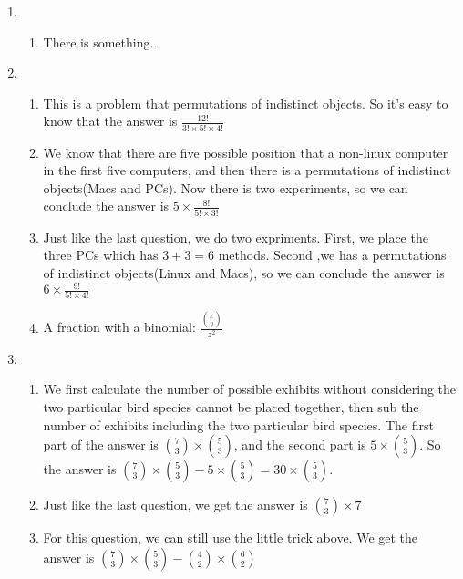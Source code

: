 \documentclass{article}
\begin{document}
\thispagestyle{fancy} %

\begin{enumerate}


	\item 
	
	\begin{enumerate}
		
		\item There is something..
		
	\end{enumerate}

	\item 
	
	\begin{enumerate}
		\item This is a problem that permutations of indistinct objects. So it's easy to know that the answer is $\frac{12!}{3!\times5!\times4!}$
		\item We know that there are five possible position that a non-linux computer in the first five computers, and then there is a permutations of indistinct objects(Macs and PCs). Now there is two experiments, so we can conclude the answer is $5\times\frac{8!}{5!\times3!}$
		\item Just like the last question, we do two expriments. First, we place the three PCs which has $3+3=6$ methods. Second ,we has a permutations of indistinct objects(Linux and Macs), so we can conclude the answer is $6\times\frac{9!}{5!\times4!}$ 
		
		\item A fraction with a binomial: $\frac{{x \choose y}}{z^2}$
	
	\end{enumerate}
	
	\item
	
	\begin{enumerate}
		\item We first calculate the number of possible exhibits without considering the two particular bird species cannot be placed together, then sub the number of exhibits including the two particular bird species. The first part of the answer is ${7 \choose 3}\times{5 \choose 3}$, and the second part is $5\times{5 \choose 3}$. So the answer is ${7 \choose 3}\times{5 \choose 3}-5\times{5 \choose 3}=30\times{5 \choose 3}$.
		\item Just like the last question, we get the answer is ${7 \choose 3}\times7$
		\item For this question, we can still use the little trick above. We get the answer is ${7 \choose 3}\times{5 \choose 3}-{4 \choose 2}\times{6 \choose 2}$
	\end{enumerate}
	

\end{enumerate}
\end{document}
